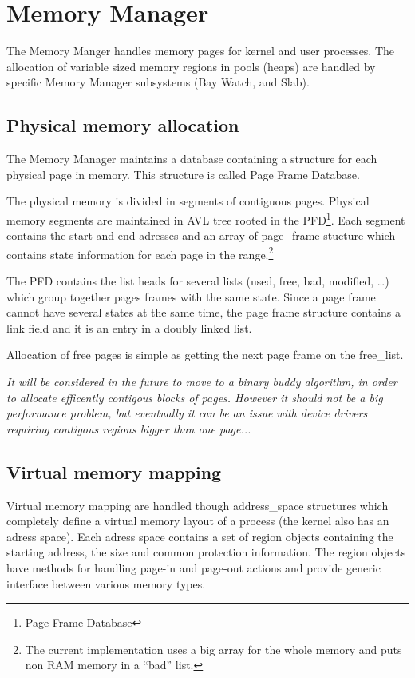 \chapter{Memory Manager}

The Memory Manger handles memory pages for kernel and
user processes. The allocation of variable sized memory regions
in pools (heaps) are handled by specific Memory Manager subsystems (Bay Watch,
and Slab).

\section{Physical memory allocation}

The Memory Manager maintains a database 
containing a structure for each physical page in memory.
This structure is called \textsf{Page Frame Database}. 

The physical memory is divided in segments of contiguous pages.
Physical memory segments are maintained in AVL tree rooted in the PFD\footnote{Page Frame Database}.
Each segment contains the start and end adresses and
an array of \textsf{page\_frame} stucture which contains state information for
each page in the range.\footnote{The current implementation uses a big array for the whole memory and puts non RAM memory in a ``bad'' list.}

The PFD contains the list heads for several lists (used, free, bad, modified, \ldots)
which group together pages frames with the same state. Since a page frame
cannot have several states at the same time, the page frame structure
contains a link field and it is an entry in a doubly linked list.

Allocation of free pages is simple as getting the next page frame on the free\_list.

\emph{It will be considered in the future to move to a binary buddy algorithm, in order
to allocate efficently contigous blocks of pages. However it should not be a big
performance problem, but eventually it can be an issue with device drivers requiring
contigous regions bigger than one page...}

\section{Virtual memory mapping}

Virtual memory mapping are handled though \textsf{address\_space} structures
which completely define a virtual memory layout of a process (the kernel also
has an adress space). Each adress space contains a set of \textsf{region} objects
containing the starting address, the size and common protection information.
 The region objects have methods for handling page-in and page-out actions 
and provide generic interface between various memory types. 

